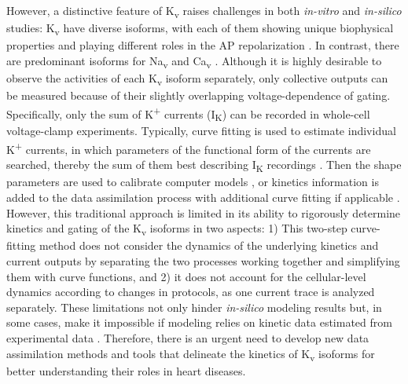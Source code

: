 \documentclass[11pt]{article}
\begin{document}
However, a distinctive feature of K\textsubscript{v} raises challenges in both \textit{in-vitro} and \textit{in-silico} studies: K\textsubscript{v} have diverse isoforms, with each of them showing unique biophysical properties and playing different roles in the AP repolarization \citep{nerbonne2005molecular}. In contrast, there are predominant isoforms for Na\textsubscript{v} and Ca\textsubscript{v} \citep{abriel2010cardiac,benitah2010type}. Although it is highly desirable to observe the activities of each K\textsubscript{v} isoform separately, only collective outputs can be measured because of their slightly overlapping voltage-dependence of gating. Specifically, only the sum of K\textsuperscript{+} currents (I\textsubscript{K}) can be recorded in whole-cell voltage-clamp experiments. Typically, curve fitting is used to estimate individual K\textsuperscript{+} currents, in which parameters of the functional form of the currents are searched, thereby the sum of them best describing I\textsubscript{K} recordings \citep{brunet2004heterogeneous}. Then the shape parameters are used to calibrate computer models \citep{kim2022simulation}, or kinetics information is added to the data assimilation process with additional curve fitting if applicable \citep{du2017silico}. However, this traditional approach is limited in its ability to rigorously determine kinetics and gating of the K\textsubscript{v} isoforms in two aspects: 1) This two-step curve-fitting method does not consider the dynamics of the underlying kinetics and current outputs by separating the two processes working together and simplifying them with curve functions, and 2) it does not account for the cellular-level dynamics according to changes in protocols, as one current trace is analyzed separately. These limitations not only hinder \textit{in-silico} modeling results but, in some cases, make it impossible if modeling relies on kinetic data estimated from experimental data \citep{kim2022simulation}. Therefore, there is an urgent need to develop new data assimilation methods and tools that delineate the kinetics of K\textsubscript{v} isoforms for better understanding their roles in heart diseases. 
\end{document}
